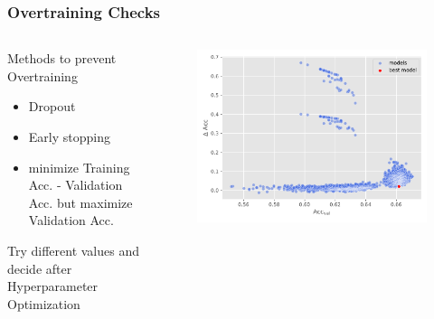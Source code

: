 \begin{frame}
    \frametitle{Overtraining Checks}
    
    \begin{columns}[T]
        \begin{column}{0.5\textwidth}
            \begin{alertblock}{Methods to prevent Overtraining}
                \begin{itemize}
                    \item Dropout
                    \item Early stopping
                    \item minimize Training Acc. - Validation Acc. 
                    \alert{but} maximize Validation Acc.
                \end{itemize}
            Try different values and decide after Hyperparameter Optimization
            \end{alertblock}
        \end{column}
        \begin{column}{0.5\textwidth}
            \begin{figure}
                \includegraphics[width=\textwidth]{../figures/HPO_scatter.pdf}
            \end{figure}
        \end{column}
    \end{columns}

    
\end{frame}